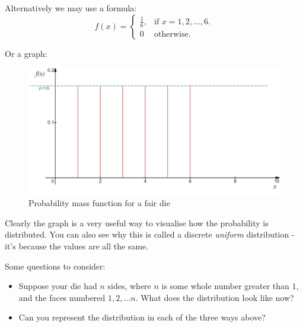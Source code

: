 \documentclass[
]{book}
\theoremstyle{definition}
\theoremstyle{definition}
\theoremstyle{definition}
\theoremstyle{definition}
\theoremstyle{remark}
\begin{document}
Alternatively we may use a formula:
\begin{equation*}
  f(x)=\begin{cases}
    \frac{1}{6}, & \text{if } x = 1, 2, \dots , 6.\\
    0 & \text{otherwise}.
  \end{cases}
\end{equation*}

Or a graph:

\begin{figure}

{\centering \includegraphics[width=0.75\linewidth]{./figures/uni_pdf} 

}

\caption{Probability mass function for a fair die}\label{fig:uniformdice}
\end{figure}

Clearly the graph is a very useful way to visualise how the probability is distributed. You can also see why this is called a discrete \emph{uniform} distribution - it's because the values are all the same.

Some questions to consider:

\begin{itemize}
\item
  Suppose your die had \(n\) sides, where \(n\) is some whole number greater than \(1\), and the faces numbered \(1,2,\dots n\). What does the distribution look like now?
\item
  Can you represent the distribution in each of the three ways above?
\end{itemize}
\end{document}
